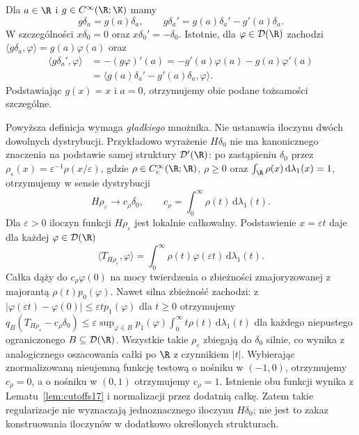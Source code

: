 \begin{przyklad}
\label{ex:multiply-delta20}
Dla $a\in\R$ i $g\in C^\infty(\R;\K)$ mamy
\[
 g\delta_a=g(a)\delta_a,\qquad
 g\delta_a'=g(a)\delta_a'-g'(a)\delta_a.
\]
W szczególności $x\delta_0=0$ oraz $x\delta_0'=-\delta_0$.
Istotnie, dla $\varphi\in\mathcal D(\R)$ zachodzi
$\langle g\delta_a,\varphi\rangle=g(a)\varphi(a)$ oraz
\[
\begin{aligned}
\langle g\delta_a',\varphi\rangle
&=-(g\varphi)'(a)=-g'(a)\varphi(a)-g(a)\varphi'(a)\\
&=\langle g(a)\delta_a'-g'(a)\delta_a,\varphi\rangle.
\end{aligned}
\]
Podstawiając $g(x)=x$ i $a=0$, otrzymujemy obie
podane tożsamości szczególne.
\end{przyklad}

\begin{uwaga}
\label{rem:no-product20}
Powyższa definicja wymaga \emph{gładkiego} mnożnika.
Nie ustanawia iloczynu dwóch dowolnych dystrybucji.
Przykładowo wyrażenie $H\delta_0$ nie ma kanonicznego
znaczenia na podstawie samej struktury $\mathcal D'(\R)$:
po zastąpieniu $\delta_0$ przez
$\rho_\varepsilon(x)=\varepsilon^{-1}\rho(x/\varepsilon)$,
gdzie $\rho\in C_c^\infty(\R;\R)$, $\rho\ge0$ oraz
$\int_\R\rho(x)\,\mathrm d\lambda_1(x)=1$,
otrzymujemy w sensie dystrybucji
\[
 H\rho_\varepsilon\longrightarrow c_\rho\delta_0,
 \qquad c_\rho=\int_0^\infty\rho(t)\,\mathrm d\lambda_1(t).
\]
Dla $\varepsilon>0$ iloczyn funkcji $H\rho_\varepsilon$
jest lokalnie całkowalny. Podstawienie $x=\varepsilon t$
daje dla każdej $\varphi\in\mathcal D(\R)$
\[
\langle T_{H\rho_\varepsilon},\varphi\rangle
=\int_0^\infty\rho(t)\varphi(\varepsilon t)\,\mathrm d\lambda_1(t).
\]
Całka dąży do $c_\rho\varphi(0)$ na mocy twierdzenia
o zbieżności zmajoryzowanej z majorantą
$\rho(t)p_0(\varphi)$.
Nawet silna zbieżność zachodzi: z
$|\varphi(\varepsilon t)-\varphi(0)|\le\varepsilon t p_1(\varphi)$
dla $t\ge0$ otrzymujemy
$q_B(T_{H\rho_\varepsilon}-c_\rho\delta_0)
\le\varepsilon\sup_{\varphi\in B}p_1(\varphi)
\int_0^\infty t\rho(t)\,\mathrm d\lambda_1(t)$
dla każdego niepustego ograniczonego $B\subseteq\mathcal D(\R)$.
Wszystkie takie $\rho_\varepsilon$ zbiegają do $\delta_0$
silnie, co wynika z analogicznego oszacowania całki po $\R$
z czynnikiem $|t|$. Wybierając znormalizowaną nieujemną
funkcję testową o nośniku w $(-1,0)$, otrzymujemy $c_\rho=0$,
a o nośniku w $(0,1)$ otrzymujemy $c_\rho=1$.
Istnienie obu funkcji wynika z Lematu~\ref{lem:cutoffs17}
i normalizacji przez dodatnią całkę.
Zatem takie regularizacje nie wyznaczają jednoznacznego
iloczynu $H\delta_0$; nie jest to zakaz konstruowania
iloczynów w dodatkowo określonych strukturach.
\end{uwaga}

